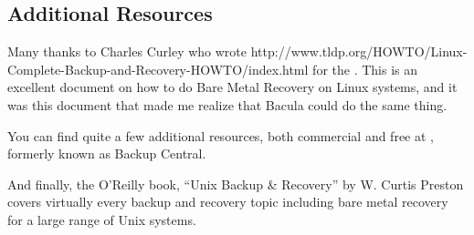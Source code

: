 \label{Resources}

\subsection*{Additional Resources}

Many thanks to Charles Curley who wrote 
{http://www.tldp.org/HOWTO/Linux-Complete-Backup-and-Recovery-HOWTO/index.html%
} for the 
. This is an
excellent document on how to do Bare Metal Recovery on Linux systems, and it
was this document that made me realize that Bacula could do the same thing. 

You can find quite a few additional resources, both commercial and free at 
, formerly known as
Backup Central. 

And finally, the O'Reilly book, ``Unix Backup \& Recovery'' by W. Curtis
Preston covers virtually every backup and recovery topic including bare metal
recovery for a large range of Unix systems. 
